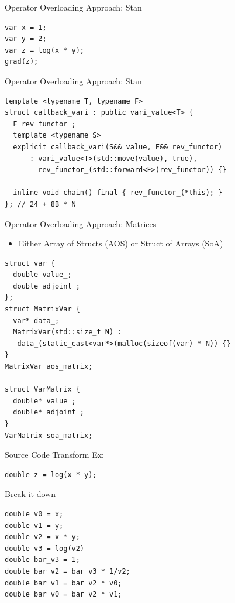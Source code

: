 \documentclass[dvipsnames]{beamer}
\begin{document}
\begin{frame}[fragile]{Operator Overloading Approach: Stan}
\begin{verbatim}
var x = 1;
var y = 2;
var z = log(x * y);
grad(z);
\end{verbatim}
\end{frame}

\begin{frame}[fragile]{Operator Overloading Approach: Stan}
\begin{verbatim}
template <typename T, typename F>
struct callback_vari : public vari_value<T> {
  F rev_functor_;
  template <typename S>
  explicit callback_vari(S&& value, F&& rev_functor)
      : vari_value<T>(std::move(value), true),
        rev_functor_(std::forward<F>(rev_functor)) {}

  inline void chain() final { rev_functor_(*this); }
}; // 24 + 8B * N
\end{verbatim}
\end{frame}

\begin{frame}[fragile]{Operator Overloading Approach: Matrices}
\begin{itemize}
    \item Either Array of Structs (AOS) or Struct of Arrays (SoA)
\end{itemize}

\begin{verbatim}
struct var {
  double value_;
  double adjoint_;
};
struct MatrixVar {
  var* data_;
  MatrixVar(std::size_t N) :
   data_(static_cast<var*>(malloc(sizeof(var) * N)) {}
}
MatrixVar aos_matrix;

struct VarMatrix {
  double* value_;
  double* adjoint_;
}
VarMatrix soa_matrix;
\end{verbatim}
\end{frame}

\begin{frame}[fragile]{Source Code Transform Ex:}
\begin{verbatim}
double z = log(x * y);
\end{verbatim}
Break it down
\begin{verbatim}
double v0 = x;
double v1 = y;
double v2 = x * y;
double v3 = log(v2)
double bar_v3 = 1;
double bar_v2 = bar_v3 * 1/v2;
double bar_v1 = bar_v2 * v0;
double bar_v0 = bar_v2 * v1;
\end{verbatim}
\end{frame}
\end{document}
